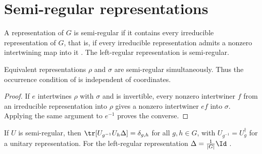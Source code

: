 \section{Semi-regular representations}
\label{sec:characters_semiregular}

\begin{definition}%
    \label{def:peps_semiregular}
    \leanok
    A representation of $G$ is semi-regular if it contains every irreducible
    representation of $G$, that is, if every irreducible representation
    admits a nonzero intertwining map into it
    \cite[Definition~4.5]{Schuch2010PEPS}. The left-regular representation
    is semi-regular.
\end{definition}

\begin{lemma}%
    \label{thm:peps_semiregular_equivalence}
    \leanok
    Equivalent representations $\rho$ and $\sigma$ are semi-regular
    simultaneously. Thus the occurrence condition of
    \cite[Definition~4.5]{Schuch2010PEPS} is independent of coordinates.
\end{lemma}

\begin{proof}\leanok
    If $e$ intertwines $\rho$ with $\sigma$ and is invertible, every
    nonzero intertwiner $f$ from an irreducible representation into
    $\rho$ gives a nonzero intertwiner $ef$ into $\sigma$. Applying the
    same argument to $e^{-1}$ proves the converse.
\end{proof}

\begin{lemma}%
    \label{thm:peps_semiregular_trace}
    \leanok
    If $U$ is semi-regular, then $\tr[U_{g^{-1}}U_h\Delta]=\delta_{g,h}$ for
    all $g,h\in G$, with $U_{g^{-1}}=U_g^\dagger$ for a unitary
    representation. For the left-regular representation
    $\Delta=\frac{1}{|G|}\Id$ \cite[Lemma~4.6]{Schuch2010PEPS}.
\end{lemma}

